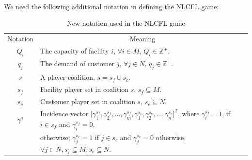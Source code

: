 \documentclass[ijoc,nonblindrev]{informs3} %
\newcommand{\Z}{\mathbb{Z}}
\begin{document}
 
We need the following additional notation in defining the NLCFL game:
\begin{table}[H]
\vspace{-2mm}
\centering
\tabcolsep=7pt
\small
\renewcommand\arraystretch{1.5}
\caption{\label{table:notations} New notation used in the NLCFL game}
\begin{tabular}[!h]{c c}
\hline
\multicolumn{1}{c}{Notation} &\multicolumn{1}{c}{Meaning}\\
\cline{1-2}
\multicolumn{1}{c}{$Q_i$} &\multicolumn{1}{l}{The capacity of facility $i$, $\forall i \in M$, $Q_i \in \Z^+$.}\\
\multicolumn{1}{c}{$q_j$} &\multicolumn{1}{l}{The demand of customer $j$, $\forall j \in N$, $q_j \in \Z^+$.}\\ 
\multicolumn{1}{c}{$s$} &\multicolumn{1}{l}{A player coalition, $s = s_f \cup s_c$.}\\
\multicolumn{1}{c}{$s_f$} &\multicolumn{1}{l}{Facility player set in coalition $s$, $s_f \subseteq M$.}\\
\multicolumn{1}{c}{$s_c$} &\multicolumn{1}{l}{Customer player set in coalition $s$, $s_c \subseteq N$.}\\
\multicolumn{1}{c}{$\gamma^s$} &\multicolumn{1}{l}{Incidence vector $\big[ \gamma^{s_f}_1,\gamma^{s_f}_2,...,\gamma^{s_f}_{m},\gamma^{s_c}_{1},\gamma^{s_c}_{2},...,\gamma^{s_c}_{n} \big]^T$, where $\gamma^{s_f}_i=1$, if $i \in s_f$ and $\gamma^{s_f}_i=0$, }\\
\multicolumn{1}{c}{} &\multicolumn{1}{l}{otherwise; $\gamma^{s_c}_j=1$ if $j \in s_c$ and $\gamma^{s_c}_j=0$ otherwise, $\forall j \in N, s_f \subseteq M, s_c \subseteq N$.}\\
\hline
\end{tabular}
\vspace{-3mm}
\end{table}
\end{document}
